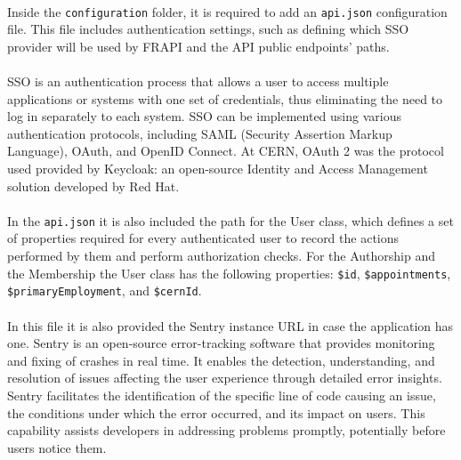 
\paragraph{} Inside the \verb|configuration| folder, it is required to add an \verb|api.json| configuration file. This file includes authentication settings, such as defining which SSO provider will be used by FRAPI and the API public endpoints' paths.

\paragraph{} SSO is an authentication process that allows a user to access multiple applications or systems with one set of credentials, thus eliminating the need to log in separately to each system. SSO can be implemented using various authentication protocols, including SAML (Security Assertion Markup Language), OAuth, and OpenID Connect. At CERN, OAuth 2 was the protocol used provided by Keycloak: an open-source Identity and Access Management solution developed by Red Hat.


\paragraph{} In the \verb|api.json| it is also included the path for the User class, which defines a set of properties required for every authenticated user to record the actions performed by them and perform authorization checks. For the Authorship and the Membership the User class has the following properties: \verb|$id|, \verb|$appointments|, \verb|$primaryEmployment|, and \verb|$cernId|.

\paragraph{} In this file it is also provided the Sentry instance URL in case the application has one. Sentry is an open-source error-tracking software that provides monitoring and fixing of crashes in real time. It enables the detection, understanding, and resolution of issues affecting the user experience through detailed error insights. Sentry facilitates the identification of the specific line of code causing an issue, the conditions under which the error occurred, and its impact on users. This capability assists developers in addressing problems promptly, potentially before users notice them.

